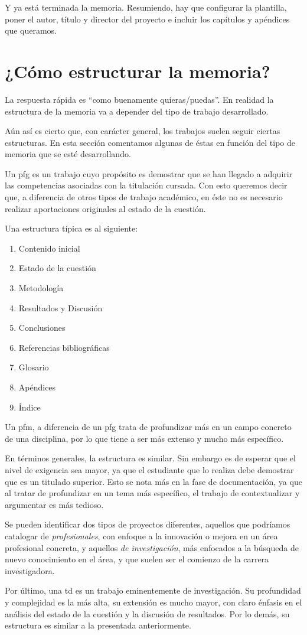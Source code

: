 Y ya está terminada la memoria. Resumiendo, hay que configurar la plantilla, poner el autor, título y director del proyecto e incluir los capítulos y apéndices que queramos.

\section{¿Cómo estructurar la memoria?}

La respuesta rápida es ``como buenamente quieras/puedas''. En realidad la estructura de la memoria va a depender del tipo de trabajo desarrollado.

Aún así es cierto que, con carácter general, los trabajos suelen seguir ciertas estructuras. En esta sección comentamos algunas de éstas en función del tipo de memoria que se esté desarrollando.

Un \gls{pfg} es un trabajo cuyo propósito es demostrar que se han llegado a adquirir las competencias asociadas con la titulación cursada. Con esto queremos decir que, a diferencia de otros tipos de trabajo académico, en éste no es necesario realizar aportaciones originales al estado de la cuestión.

Una estructura típica es al siguiente:

\begin{enumerate}
    \item Contenido inicial
    \item Estado de la cuestión
    \item Metodología
    \item Resultados y Discusión
    \item Conclusiones
    \item Referencias bibliográficas
    \item Glosario
    \item Apéndices
    \item Índice
\end{enumerate}

Un \gls{pfm}, a diferencia de un \gls{pfg} trata de profundizar más en un campo concreto de una disciplina, por lo que tiene a ser más extenso y mucho más específico.

En términos generales, la estructura es similar. Sin embargo es de esperar que el nivel de exigencia sea mayor, ya que el estudiante que lo realiza debe demostrar que es un titulado superior. Esto se nota más en la fase de documentación, ya que al tratar de profundizar en un tema más específico, el trabajo de contextualizar y argumentar es más tedioso.

Se pueden identificar dos tipos de proyectos diferentes, aquellos que podríamos catalogar de \textit{profesionales}, con enfoque a la innovación o mejora en un área profesional concreta, y aquellos \textit{de investigación}, más enfocados a la búsqueda de nuevo conocimiento en el área, y que suelen ser el comienzo de la carrera investigadora.

Por último, una \gls{td} es un trabajo eminentemente de investigación. Su profundidad y complejidad es la más alta, su extensión es mucho mayor, con claro énfasis en el análisis del estado de la cuestión y la discusión de resultados. Por lo demás, su estructura es similar a la presentada anteriormente.